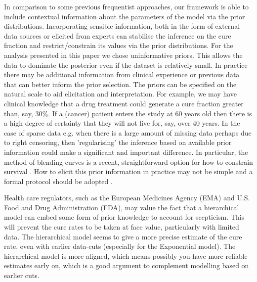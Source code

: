 \documentclass[AMA,STIX1COL]{WileyNJD-v2}
\begin{document}
In comparison to some previous frequentist approaches, our framework is able to include contextual information about the parameters of the model via the prior distributions.
Incorporating sensible information, both in the form of external data sources or elicited from experts can
stabilise the inference on the cure fraction and restrict/constrain its values via the prior distributions.
For the analysis presented in this paper we chose uninformative priors.
This allows the data to dominate the posterior even if the dataset is relatively small.
In practice there may be additional information from clinical experience or previous data that can better inform the prior selection.
The priors can be specified on the natural scale to aid elicitation and interpretation.
For example, we may have clinical knowledge that a drug treatment could generate a cure fraction greater than, say, 30\%.
If a (cancer) patient enters the study at 60 years old then there is a high degree of certainty that they will not live for, say, over 40 years.
In the case of sparse data e.g. when there is a large amount of missing data perhaps due to right censoring, then 'regularising' the inference based on available prior information could make a significant and important difference. In particular, the method of blending curves is a recent, straightforward option for how to constrain survival \citep{Che2022}. 
How to elicit this prior information in practice may not be simple and a formal protocol should be adopted \cite{OHagan2019}.

Health care regulators, such as the European Medicines Agency (EMA) and U.S. Food and Drug Administration (FDA), may value the fact that a hierarchical model can embed some form of prior knowledge to account for scepticism.
This will prevent the cure rates to be taken at face value, particularly with limited data.
The hierarchical model seems to give a more precise estimate of the cure rate, even with earlier data-cuts (especially for the Exponential model).
The hierarchical model is more aligned, which means possibly you have more reliable estimates early on, which is a good argument to complement modelling based on earlier cuts.
\end{document}

